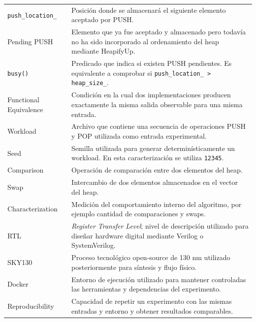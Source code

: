 \documentclass[11pt,a4paper]{article}
\begin{document}
\begin{longtable}{p{} p{}}
\texttt{push\_location\_} &
Posición donde se almacenará el siguiente elemento aceptado por PUSH. \\

Pending PUSH &
Elemento que ya fue aceptado y almacenado pero todavía no ha sido
incorporado al ordenamiento del heap mediante HeapifyUp. \\

\texttt{busy()} &
Predicado que indica si existen PUSH pendientes. Es equivalente a
comprobar si \texttt{push\_location\_ > heap\_size\_}. \\

Functional Equivalence &
Condición en la cual dos implementaciones producen exactamente la misma
salida observable para una misma entrada. \\

Workload &
Archivo que contiene una secuencia de operaciones PUSH y POP utilizada
como entrada experimental. \\

Seed &
Semilla utilizada para generar determinísticamente un workload. En esta
caracterización se utiliza \texttt{12345}. \\

Comparison &
Operación de comparación entre dos elementos del heap. \\

Swap &
Intercambio de dos elementos almacenados en el vector del heap. \\

Characterization &
Medición del comportamiento interno del algoritmo, por ejemplo cantidad
de comparaciones y swaps. \\

RTL &
\emph{Register Transfer Level}; nivel de descripción utilizado para
diseñar hardware digital mediante Verilog o SystemVerilog. \\

SKY130 &
Proceso tecnológico open-source de 130 nm utilizado posteriormente para
síntesis y flujo físico. \\

Docker &
Entorno de ejecución utilizado para mantener controladas las
herramientas y dependencias del experimento. \\

Reproducibility &
Capacidad de repetir un experimento con las mismas entradas y entorno y
obtener resultados comparables. \\

\bottomrule
\end{longtable}
\end{document}
